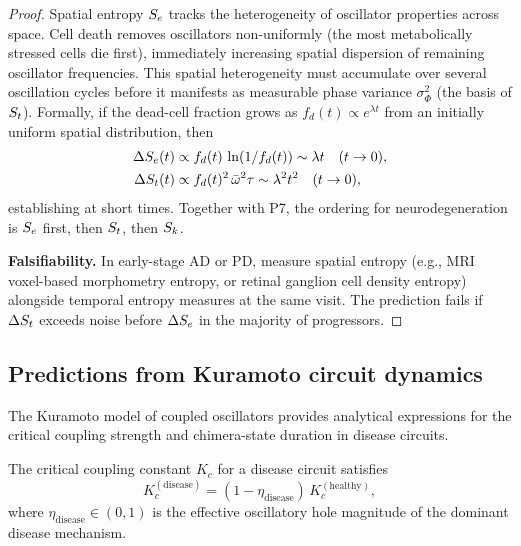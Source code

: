 \begin{proof}
Spatial entropy $S_e$ tracks the heterogeneity of oscillator properties across
space.  Cell death removes oscillators non-uniformly (the most metabolically
stressed cells die first), immediately increasing spatial dispersion of
remaining oscillator frequencies.  This spatial heterogeneity must accumulate
over several oscillation cycles before it manifests as measurable phase
variance $\sigma_\Phi^2$ (the basis of $S_t$).  Formally, if the dead-cell
fraction grows as $f_d(t) \propto e^{\lambda t}$ from an initially uniform
spatial distribution, then
\begin{align}
  \Delta S_e(t) &\propto f_d(t)\,\ln(1/f_d(t)) \sim \lambda t \quad (t \to 0),
    \label{eq:ch07-Se-growth} \\
  \Delta S_t(t) &\propto f_d(t)^2\,\bar{\omega}^2 \tau \sim \lambda^2 t^2 \quad (t \to 0),
    \label{eq:ch07-St-growth}
\end{align}
establishing  at short times.  Together with P7,
the ordering for neurodegeneration is $S_e$ first, then $S_t$, then $S_k$.

\textbf{Falsifiability.}  In early-stage AD or PD, measure spatial entropy
(e.g., MRI voxel-based morphometry entropy, or retinal ganglion cell density
entropy) alongside temporal entropy measures at the same visit.  The prediction
fails if $\Delta S_t$ exceeds noise before $\Delta S_e$ in the majority of
progressors.
\end{proof}

\subsection{Predictions from Kuramoto circuit dynamics}
\label{sec:ch07-pred-kuramoto}

The Kuramoto model of coupled oscillators provides analytical expressions for
the critical coupling strength and chimera-state duration in disease circuits.

\begin{theorem}
\label{thm:ch07-P9}
The critical coupling constant $K_c$ for a disease circuit satisfies
\begin{equation}
  K_c^{(\mathrm{disease})} = (1 - \eta_{\mathrm{disease}})\,K_c^{(\mathrm{healthy})},
  \label{eq:ch07-P9-Kc}
\end{equation}
where $\eta_{\mathrm{disease}} \in (0,1)$ is the effective oscillatory hole
magnitude of the dominant disease mechanism.
\end{theorem}

